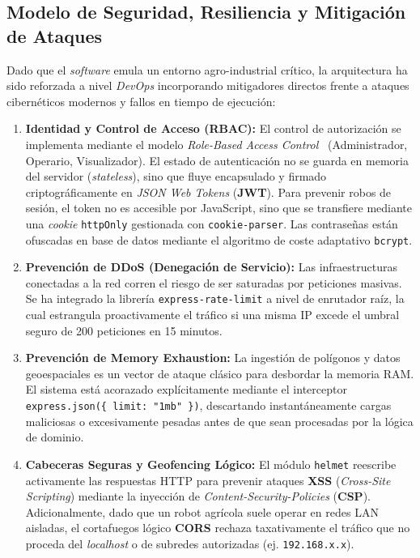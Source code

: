 \subsection{Modelo de Seguridad, Resiliencia y Mitigación de Ataques}
Dado que el \textit{software} emula un entorno agro-industrial crítico, la arquitectura ha sido reforzada a nivel \textit{DevOps} incorporando mitigadores directos frente a ataques cibernéticos modernos y fallos en tiempo de ejecución:


\begin{enumerate}
    \item \textbf{Identidad y Control de Acceso (RBAC):} El control de autorización se implementa mediante el modelo \textit{Role-Based Access Control~\cite{rbac}} (Administrador, Operario, Visualizador). El estado de autenticación no se guarda en memoria del servidor (\textit{stateless}), sino que fluye encapsulado y firmado criptográficamente en \textit{JSON Web Tokens} (\textbf{JWT}). Para prevenir robos de sesión, el token no es accesible por JavaScript, sino que se transfiere mediante una \textit{cookie} \texttt{httpOnly} gestionada con \texttt{cookie-parser}. Las contraseñas están ofuscadas en base de datos mediante el algoritmo de coste adaptativo \texttt{bcrypt}.
    \item \textbf{Prevención de DDoS (Denegación de Servicio):} Las infraestructuras conectadas a la red corren el riesgo de ser saturadas por peticiones masivas. Se ha integrado la librería \texttt{express-rate-limit} a nivel de enrutador raíz, la cual estrangula proactivamente el tráfico si una misma IP excede el umbral seguro de 200 peticiones en 15 minutos.
    \item \textbf{Prevención de Memory Exhaustion:} La ingestión de polígonos y datos geoespaciales es un vector de ataque clásico para desbordar la memoria RAM. El sistema está acorazado explícitamente mediante el interceptor \texttt{express.json(\{ limit: "1mb" \})}, descartando instantáneamente cargas maliciosas o excesivamente pesadas antes de que sean procesadas por la lógica de dominio.
    \item \textbf{Cabeceras Seguras y Geofencing Lógico:} El módulo \texttt{helmet} reescribe activamente las respuestas HTTP para prevenir ataques \textbf{XSS} (\textit{Cross-Site Scripting}) mediante la inyección de \textit{Content-Security-Policies} (\textbf{CSP}). Adicionalmente, dado que un robot agrícola suele operar en redes LAN aisladas, el cortafuegos lógico \textbf{CORS} rechaza taxativamente el tráfico que no proceda del \textit{localhost} o de subredes autorizadas (ej. \texttt{192.168.x.x}).

\end{enumerate}
